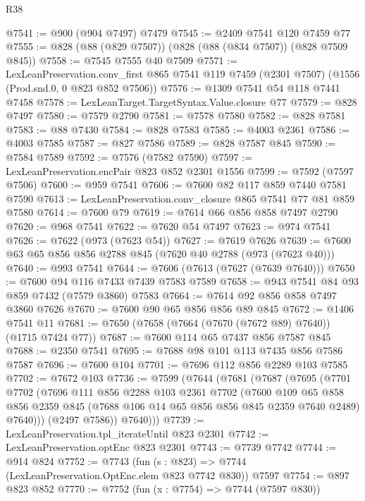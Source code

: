 \begin{lexlean}{R38}
\begin{coremodule}
@7541 := @900 (@904 @7497) @7479
@7545 := @2409 @7541 @120 @7459 @77
@7555 := @828 (@88 (@829 @7507)) (@828 (@88 (@834 @7507)) (@828 @7509 @845))
@7558 := @7545 @7555 @40 @7509
@7571 := LexLeanPreservation.conv_first
    @865
    @7541
    @119
    @7459
    (@2301 @7507)
    (@1556 (Prod.snd.{0, 0} @823 @852 @7506))
@7576 := @1309 @7541 @54 @118 @7441 @7458
@7578 := LexLeanTarget.TargetSyntax.Value.closure @77
@7579 := @828 @7497
@7580 := @7579 @2790
@7581 := @7578 @7580
@7582 := @828 @7581
@7583 := @88 @7430
@7584 := @828 @7583
@7585 := @4003 @2361
@7586 := @4003 @7585
@7587 := @827 @7586
@7589 := @828 @7587 @845
@7590 := @7584 @7589
@7592 := @7576 (@7582 @7590)
@7597 := LexLeanPreservation.encPair @823 @852 @2301 @1556
@7599 := @7592 (@7597 @7506)
@7600 := @959 @7541
@7606 := @7600 @82 @117 @859 @7440 @7581 @7590
@7613 := LexLeanPreservation.conv_closure @865 @7541 @77 @81 @859 @7580
@7614 := @7600 @79
@7619 := @7614 @66 @856 @858 @7497 @2790
@7620 := @968 @7541
@7622 := @7620 @54 @7497
@7623 := @974 @7541
@7626 := @7622 (@973 (@7623 @54))
@7627 := @7619 @7626
@7639 := @7600 @63 @65 @856 @856 @2788 @845 (@7620 @40 @2788 (@973 (@7623 @40)))
@7640 := @993 @7541
@7644 := @7606 (@7613 (@7627 (@7639 @7640)))
@7650 := @7600 @94 @116 @7433 @7439 @7583 @7589
@7658 := @943 @7541 @84 @93 @859 @7432 (@7579 @3860) @7583
@7664 := @7614 @92 @856 @858 @7497 @3860 @7626
@7670 := @7600 @90 @65 @856 @856 @89 @845
@7672 := @1406 @7541 @11
@7681 := @7650 (@7658 (@7664 (@7670 (@7672 @89) @7640)) (@1715 @7424 @77))
@7687 := @7600 @114 @65 @7437 @856 @7587 @845
@7688 := @2350 @7541
@7695 := @7688 @98 @101 @113 @7435 @856 @7586 @7587
@7696 := @7600 @104
@7701 := @7696 @112 @856 @2289 @103 @7585
@7702 := @7672 @103
@7736 := @7599
    (@7644
      (@7681
        (@7687
          (@7695
            (@7701
              @7702
              (@7696
                @111
                @856
                @2288
                @103
                @2361
                @7702
                (@7600
                  @109
                  @65
                  @858
                  @856
                  @2359
                  @845
                  (@7688 @106 @14 @65 @856 @856 @845 @2359 @7640 @2489)
                  @7640)))
            (@2497 @7586))
          @7640)))
@7739 := LexLeanPreservation.tpl_iterateUntil @823 @2301
@7742 := LexLeanPreservation.optEnc @823 @2301
@7743 := @7739 @7742
@7744 := @914 @824
@7752 := @7743 (fun (s : @823) => @7744 (LexLeanPreservation.OptEnc.elem @823 @7742 @830)) @7597
@7754 := @897 @823 @852
@7770 := @7752
    (fun (x : @7754) => @7744 (@7597 @830))

\end{coremodule}
\end{lexlean}
